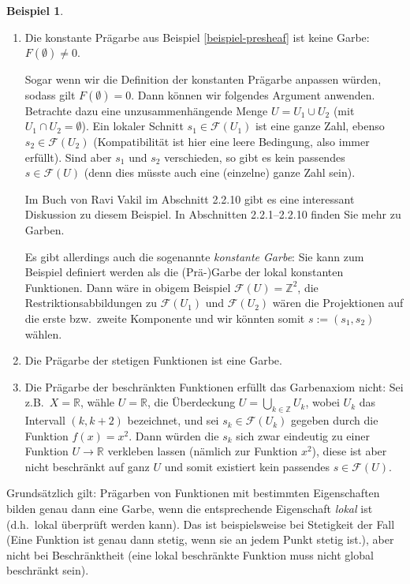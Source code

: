 \documentclass[reqno,12pt]{article}
\numberwithin{equation}{section}
\theoremstyle{plain}
\theoremstyle{definition}
\newtheorem{example}[thm]{Beispiel}
\begin{document}
\begin{example}
\
\begin{enumerate}
	\item Die konstante Prägarbe aus Beispiel \ref{beispiel-presheaf} ist keine Garbe: $F(\emptyset) \neq 0$.
	
	\smallskip
	
	Sogar wenn wir die Definition der konstanten Prägarbe anpassen würden, sodass gilt $F(\emptyset) = 0$.
	Dann können wir folgendes Argument anwenden.
	 Betrachte dazu eine unzusammenhängende Menge $U=U_1\cup U_2$ (mit $U_1\cap U_2=\emptyset$). Ein lokaler Schnitt $s_1\in\mathcal{F}(U_1)$ ist eine ganze Zahl, ebenso $s_2\in \mathcal{F}(U_2)$ (Kompatibilität ist hier eine leere Bedingung, also immer erfüllt). Sind aber $s_1$ und $s_2$ verschieden, so gibt es kein passendes $s\in \mathcal{F}(U)$ (denn dies müsste auch eine (einzelne) ganze Zahl sein).
	 
 	\smallskip
	 
	 Im Buch von Ravi Vakil \cite{Va} im Abschnitt 2.2.10 gibt es eine interessant Diskussion zu diesem Beispiel.
	 In Abschnitten 2.2.1--2.2.10 finden Sie mehr zu Garben.

	Es gibt allerdings auch die sogenannte \emph{konstante Garbe}: Sie kann zum Beispiel definiert werden als die (Prä-)Garbe der lokal konstanten Funktionen. Dann wäre in obigem Beispiel $\mathcal{F}(U)=\mathbb{Z}^2$, die Restriktionsabbildungen zu $\mathcal{F}(U_1)$ und $\mathcal{F}(U_2)$ wären die Projektionen auf die erste bzw.\ zweite Komponente und wir könnten somit $s:=(s_1,s_2)$ wählen.
	\item Die Prägarbe der stetigen Funktionen ist eine Garbe.
	\item Die Prägarbe der beschränkten Funktionen erfüllt das Garbenaxiom nicht: Sei z.B.\ $X=\mathbb{R}$, wähle $U=\mathbb{R}$, die Überdeckung $U=\bigcup_{k\in \mathbb{Z}} U_k$, wobei $U_k$ das Intervall $(k,k+2)$ bezeichnet, und sei $s_k\in \mathcal{F}(U_k)$ gegeben durch die Funktion $f(x)=x^2$. Dann würden die $s_k$ sich zwar eindeutig zu einer Funktion $U\to \mathbb{R}$ verkleben lassen (nämlich zur Funktion $x^2$), diese ist aber nicht beschränkt auf ganz $U$ und somit existiert kein passendes $s\in \mathcal{F}(U)$.
\end{enumerate}
\end{example}
Grundsätzlich gilt: Prägarben von Funktionen mit bestimmten Eigenschaften bilden genau dann eine Garbe, wenn die entsprechende Eigenschaft \emph{lokal} ist (d.h.\ lokal überprüft werden kann). Das ist beispielsweise bei Stetigkeit der Fall (\glqq Eine Funktion ist genau dann stetig, wenn sie an jedem Punkt stetig ist.\grqq), aber nicht bei Beschränktheit (eine lokal beschränkte Funktion muss nicht global beschränkt sein).
\end{document}
